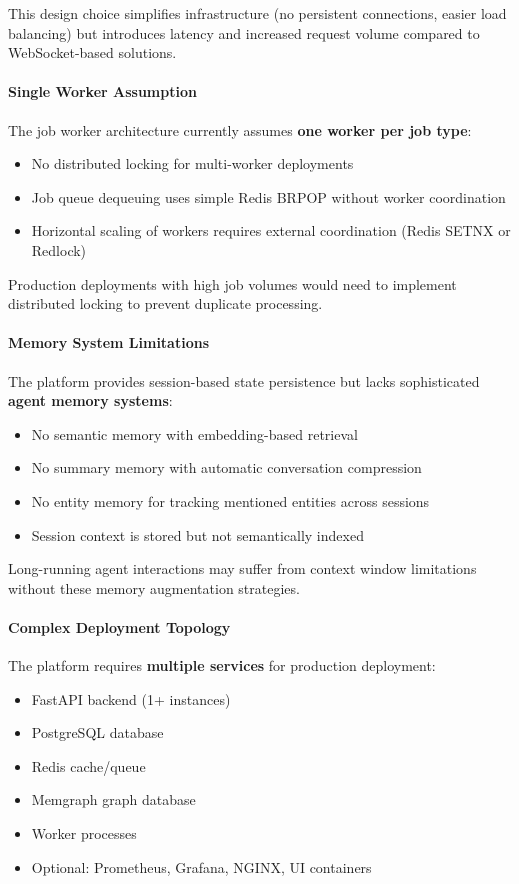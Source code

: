 This design choice simplifies infrastructure (no persistent connections, easier load balancing) but introduces latency and increased request volume compared to WebSocket-based solutions.

\paragraph{Single Worker Assumption}
The job worker architecture currently assumes \textbf{one worker per job type}:
\begin{itemize}
    \item No distributed locking for multi-worker deployments
    \item Job queue dequeuing uses simple Redis BRPOP without worker coordination
    \item Horizontal scaling of workers requires external coordination (Redis SETNX or Redlock)
\end{itemize}

Production deployments with high job volumes would need to implement distributed locking to prevent duplicate processing.

\paragraph{Memory System Limitations}
The platform provides session-based state persistence but lacks sophisticated \textbf{agent memory systems}:
\begin{itemize}
    \item No semantic memory with embedding-based retrieval
    \item No summary memory with automatic conversation compression
    \item No entity memory for tracking mentioned entities across sessions
    \item Session context is stored but not semantically indexed
\end{itemize}

Long-running agent interactions may suffer from context window limitations without these memory augmentation strategies.

\paragraph{Complex Deployment Topology}
The platform requires \textbf{multiple services} for production deployment:
\begin{itemize}
    \item FastAPI backend (1+ instances)
    \item PostgreSQL database
    \item Redis cache/queue
    \item Memgraph graph database
    \item Worker processes
    \item Optional: Prometheus, Grafana, NGINX, UI containers
\end{itemize}

